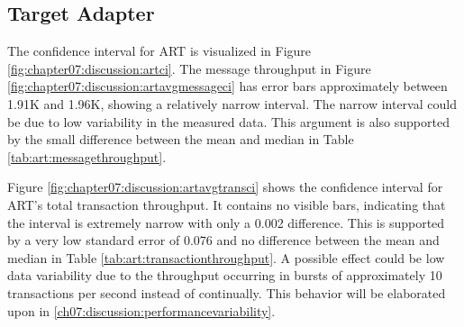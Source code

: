 \subsection{Target Adapter}
The confidence interval for \ac{ART} is visualized in Figure \ref{fig:chapter07:discussion:artci}. The message throughput in Figure \ref{fig:chapter07:discussion:artavgmessageci} has error bars approximately between 1.91K and 1.96K, showing a relatively narrow interval. The narrow interval could be due to low variability in the measured data. This argument is also supported by the small difference between the mean and median in Table \ref{tab:art:messagethroughput}.

Figure \ref{fig:chapter07:discussion:artavgtransci} shows the confidence interval for \ac{ART}'s total transaction throughput. It contains no visible bars, indicating that the interval is extremely narrow with only a 0.002 difference. This is supported by a very low standard error of 0.076 and no difference between the mean and median in Table \ref{tab:art:transactionthroughput}. A possible effect could be low data variability due to the throughput occurring in bursts of approximately 10 transactions per second instead of continually. This behavior will be elaborated upon in \ref{ch07:discussion:performancevariability}.

